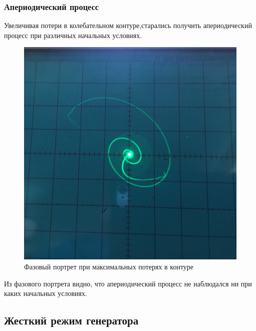 \subsubsection{Апериодический процесс}
Увеличивая потери в колебательном контуре,старались получить апериодический процесс при различных начальных условиях.
\begin{figure}[h]
	\centering
	\begin{minipage}{0.32\linewidth}
	\includegraphics[width=\linewidth]{photo/task1d1.jpg}
	\end{minipage}
	\caption{Фазовый портрет при максимальных потерях в контуре}
	\label{fig6}
\end{figure}
Из фазового портрета видно, что апериодический процесс не наблюдался ни при каких начальных условиях.
\subsection{Жесткий режим генератора}
